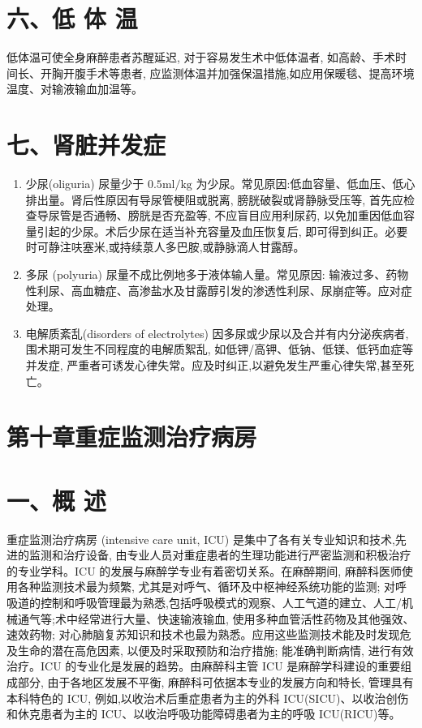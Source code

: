 \documentclass[10pt]{article}
\begin{document}
\section*{六、低 体 温}
低体温可使全身麻醉患者苏醒延迟, 对于容易发生术中低体温者, 如高龄、手术时间长、开胸开腹手术等患者, 应监测体温并加强保温措施,如应用保暖毯、提高环境温度、对输液输血加温等。

\section*{七、肾脏并发症}
\begin{enumerate}
  \item 少尿(oliguria) 尿量少于 $0.5 \mathrm{ml} / \mathrm{kg}$ 为少尿。常见原因:低血容量、低血压、低心排出量。肾后性原因有导尿管梗阻或脱离, 膀胱破裂或肾静脉受压等, 首先应检查导尿管是否通畅、膀胱是否充盈等, 不应盲目应用利尿药, 以免加重因低血容量引起的少尿。术后少尿在适当补充容量及血压恢复后, 即可得到纠正。必要时可静注呋塞米,或持续葲人多巴胺,或静脉滴人甘露醇。

  \item 多尿 (polyuria) 尿量不成比例地多于液体输人量。常见原因: 输液过多、药物性利尿、高血糖症、高渗盐水及甘露醇引发的渗透性利尿、尿崩症等。应对症处理。

  \item 电解质紊乱(disorders of electrolytes) 因多尿或少尿以及合并有内分泌疾病者, 围术期可发生不同程度的电解质絮乱, 如低钾/高钾、低钠、低镁、低钙血症等并发症, 严重者可诱发心律失常。应及时纠正,以避免发生严重心律失常,甚至死亡。

\end{enumerate}

\section*{第十章重症监测治疗病房}
\section*{一、概 述}
重症监测治疗病房 (intensive care unit, ICU) 是集中了各有关专业知识和技术,先进的监测和治疗设备, 由专业人员对重症患者的生理功能进行严密监测和积极治疗的专业学科。ICU 的发展与麻醉学专业有着密切关系。在麻醉期间, 麻醉科医师使用各种监测技术最为频繁, 尤其是对呼气、循环及中枢神经系统功能的监测; 对呼吸道的控制和呼吸管理最为熟悉,包括呼吸模式的观察、人工气道的建立、人工/机械通气等;术中经常进行大量、快速输液输血, 使用多种血管活性药物及其他强效、速效药物; 对心肺脑复苏知识和技术也最为熟悉。应用这些监测技术能及时发现危及生命的潜在高危因素, 以便及时采取预防和治疗措施; 能准确判断病情, 进行有效治疗。ICU 的专业化是发展的趋势。由麻醉科主管 ICU 是麻醉学科建设的重要组成部分, 由于各地区发展不平衡, 麻醉科可依据本专业的发展方向和特长, 管理具有本科特色的 ICU, 例如,以收治术后重症患者为主的外科 ICU(SICU)、以收治创伤和休克患者为主的 ICU、以收治呼吸功能障碍患者为主的呼吸 ICU(RICU)等。
\end{document}
